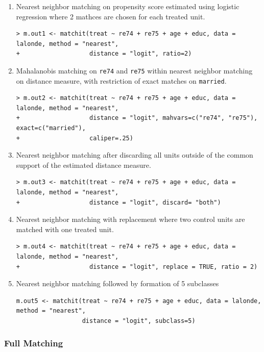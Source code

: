\documentclass[oneside,letterpaper,titlepage]{article}
\begin{document}
\begin{enumerate}

\item Nearest neighbor matching on propensity score estimated using
  logistic regression where 2 mathces are chosen for each treated unit.
\begin{verbatim}
> m.out1 <- matchit(treat ~ re74 + re75 + age + educ, data = lalonde, method = "nearest", 
+                   distance = "logit", ratio=2)
\end{verbatim}

\item Mahalanobis matching on {\tt re74} and {\tt re75} within nearest
  neighbor matching on distance measure, with restriction of exact
  matches on {\tt married}.
\begin{verbatim}
> m.out2 <- matchit(treat ~ re74 + re75 + age + educ, data = lalonde, method = "nearest", 
+                   distance = "logit", mahvars=c("re74", "re75"), exact=c("married"), 
+                   caliper=.25)
\end{verbatim}

\item Nearest neighbor matching after discarding all units outside of
  the common support of the estimated distance measure.
\begin{verbatim}
> m.out3 <- matchit(treat ~ re74 + re75 + age + educ, data = lalonde, method = "nearest", 
+                   distance = "logit", discard= "both")
\end{verbatim}

\item Nearest neighbor matching with replacement where two control
  units are matched with one treated unit.
\begin{verbatim}
> m.out4 <- matchit(treat ~ re74 + re75 + age + educ, data = lalonde, method = "nearest", 
+                   distance = "logit", replace = TRUE, ratio = 2)
\end{verbatim}

\item Nearest neighbor matching followed by formation of 5 subclasses
\begin{verbatim}
m.out5 <- matchit(treat ~ re74 + re75 + age + educ, data = lalonde, method = "nearest", 
                  distance = "logit", subclass=5)
\end{verbatim}
\end{enumerate}

\subsubsection{Full Matching}
\label{subsubsec:full}
\end{document}
